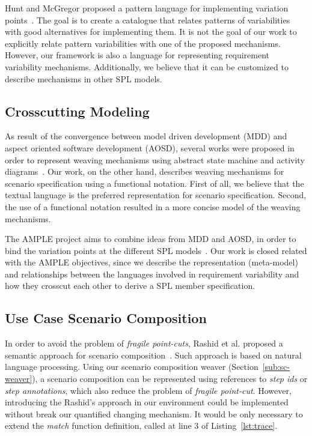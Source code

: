 \documentclass{acm_proc_article-sp}
\begin{document}
Hunt and McGregor proposed a pattern language for implementing
variation points~\cite{hunt-splc-2006}. The goal is to create a
catalogue that relates patterns of variabilities with good
alternatives for implementing them. It is not the goal of our work
to explicitly relate pattern variabilities with one of the proposed
mechanisms. However, our framework is also a language for
representing requirement variability mechanisms. Additionally, we
believe that it can be customized to describe mechanisms in other
SPL models.

\subsection{Crosscutting Modeling}

As result of the convergence between model driven development (MDD)
and aspect oriented software development (AOSD), several works were
proposed in order to represent weaving mechanisms using abstract
state machine and activity
diagrams~\cite{noda-aom-2006,thomas-aom-2006}. Our work, on the
other hand, describes weaving mechanisms for scenario specification
using a functional notation. First of all, we believe that the
textual language is the preferred representation for scenario
specification. Second, the use of a functional notation resulted in
a more concise model of the weaving mechanisms.

The AMPLE project aims to combine ideas from MDD and AOSD, in order
to bind the variation points at the different SPL
models~\cite{ample-url}. Our work is closed related with the AMPLE
objectives, since we describe the representation (meta-model) and
relationships between the languages involved in requirement
variability and how they crosscut each other to derive a SPL member
specification.

\subsection{Use Case Scenario Composition}

In order to avoid the problem of \emph{fragile point-cuts}, Rashid
et al. proposed a semantic approach for scenario
composition~\cite{rashid-aosd-2007}. Such approach is based on
natural language processing. Using our scenario composition weaver
(Section~\ref{sub:sc-weaver}), a scenario composition can be
represented using references to \emph{step ids} or \emph{step annotations}, 
which also reduce the problem of \emph{fragile point-cut}. However,
introducing the Rashid's approach in our environment could be
implemented without break our quantified changing mechanism. It
would be only necessary to extend the \emph{match} function
definition, called at line 3 of Listing~\ref{lst:trace}.
\end{document}
